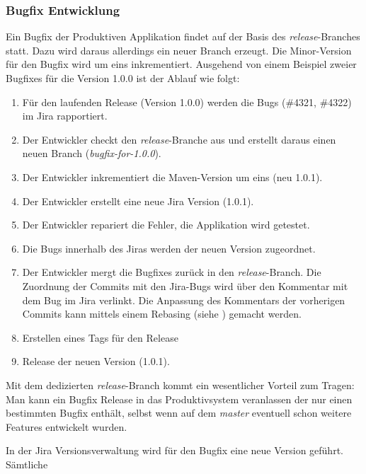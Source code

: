 \subsubsection{Bugfix Entwicklung}
Ein Bugfix der Produktiven Applikation findet auf der Basis des \textit{release}-Branches statt. Dazu wird daraus allerdings ein neuer Branch erzeugt. Die Minor-Version für den Bugfix wird um eins inkrementiert. Ausgehend von einem Beispiel zweier Bugfixes für die Version 1.0.0 ist der Ablauf wie folgt:
\begin{enumerate}
\item Für den laufenden Release (Version 1.0.0) werden die Bugs (\#4321, \#4322) im Jira rapportiert.
\item Der Entwickler checkt den \textit{release}-Branche aus und erstellt daraus einen neuen Branch (\textit{bugfix-for-1.0.0}).
\item Der Entwickler inkrementiert die Maven-Version um eins (neu 1.0.1).
\item Der Entwickler erstellt eine neue Jira Version (1.0.1).
\item Der Entwickler repariert die Fehler, die Applikation wird getestet.
\item Die Bugs innerhalb des Jiras werden der neuen Version zugeordnet.
\item Der Entwickler mergt die Bugfixes zurück in den \textit{release}-Branch. Die Zuordnung der Commits mit den Jira-Bugs wird über den Kommentar mit dem Bug im Jira verlinkt. Die Anpassung des Kommentars der vorherigen Commits kann mittels einem Rebasing (siehe \cite{dilger201111}) gemacht werden.
\item Erstellen eines Tags für den Release
\item Release der neuen Version (1.0.1).
\end{enumerate}
Mit dem dedizierten \textit{release}-Branch kommt ein wesentlicher Vorteil zum Tragen: Man kann ein Bugfix Release in das Produktivsystem veranlassen der nur einen bestimmten Bugfix enthält, selbst wenn auf dem \textit{master} eventuell schon weitere Features entwickelt wurden.

In der Jira Versionsverwaltung wird für den Bugfix eine neue Version geführt. Sämtliche 


